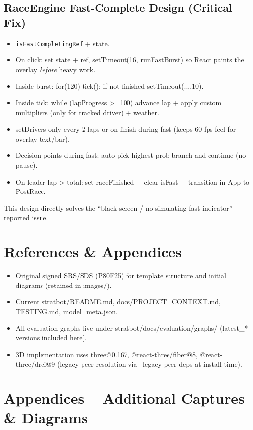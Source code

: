 \documentclass[12pt,a4paper]{article}
\begin{document}
\subsection{RaceEngine Fast-Complete Design (Critical Fix)}
\begin{itemize}
\item \texttt{isFastCompletingRef} + state.
\item On click: set state + ref, setTimeout(16, runFastBurst) so React paints the overlay \textit{before} heavy work.
\item Inside burst: for(120) tick(); if not finished setTimeout(...,10).
\item Inside tick: while (lapProgress >=100) advance lap + apply custom multipliers (only for tracked driver) + weather.
\item setDrivers only every 2 laps or on finish during fast (keeps 60 fps feel for overlay text/bar).
\item Decision points during fast: auto-pick highest-prob branch and continue (no pause).
\item On leader lap > total: set raceFinished + clear isFast + transition in App to PostRace.
\end{itemize}

This design directly solves the ``black screen / no simulating fast indicator'' reported issue.

\section{References \& Appendices}
\begin{itemize}
\item Original signed SRS/SDS (P80F25) for template structure and initial diagrams (retained in images/).
\item Current stratbot/README.md, docs/PROJECT\_CONTEXT.md, TESTING.md, model\_meta.json.
\item All evaluation graphs live under stratbot/docs/evaluation/graphs/ (latest\_* versions included here).
\item 3D implementation uses three@0.167, @react-three/fiber@8, @react-three/drei@9 (legacy peer resolution via --legacy-peer-deps at install time).
\end{itemize}

\newpage
\section{Appendices -- Additional Captures \& Diagrams}
\end{document}
